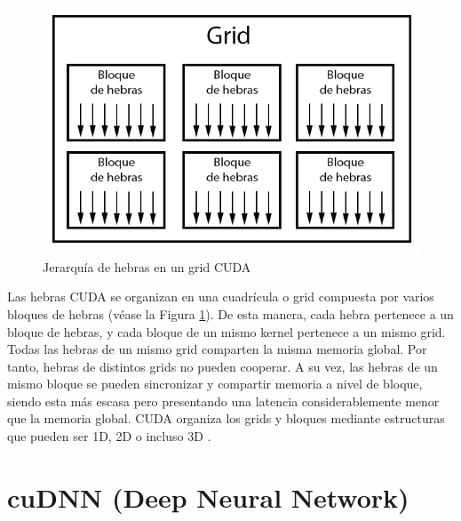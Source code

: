 \begin{figure}[H]
	\centering
	\includegraphics[scale=0.5]{imagenes/cuda_grid.jpg}  
	\caption{Jerarquía de hebras en un grid CUDA}
	\label{fig:cuda_grid}
\end{figure}

Las hebras CUDA se organizan en una cuadrícula o grid compuesta por varios bloques de hebras (véase la Figura \ref{fig:cuda_grid}). De esta manera, cada hebra pertenece a un bloque de hebras, y cada bloque de un mismo kernel pertenece a un mismo grid. Todas las hebras de un mismo grid comparten la misma memoria global. Por tanto, hebras de distintos grids no pueden cooperar. A su vez, las hebras de un mismo bloque se pueden sincronizar y compartir memoria a nivel de bloque, siendo esta más escasa pero presentando una latencia considerablemente menor que la memoria global. CUDA organiza los grids y bloques mediante estructuras que pueden ser 1D, 2D o incluso 3D \cite{Professional_CUDA_C}.

\section{cuDNN (Deep Neural Network)}

